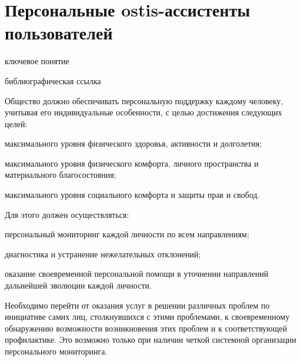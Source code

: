 \section{Персональные ostis-ассистенты пользователей}
{\label{sec_ostis_assistant}} 

\begin{SCn}

\begin{scnrelfromlist}{ключевое понятие}
\end{scnrelfromlist}

\bigskip

\begin{scnrelfromlist}{библиографическая ссылка}
\end{scnrelfromlist}

\end{SCn}

Общество должно обеспечивать персональную поддержку каждому человеку, учитывая его индивидуальные особенности, с целью достижения следующих целей:
\begin{textitemize}
    \item максимального уровня физического здоровья, активности и долголетия;
    \item максимального уровня физического комфорта, личного пространства и материального благосостояния;
    \item максимального уровня социального комфорта и защиты прав и свобод.
\end{textitemize}

Для этого должен осуществляться:
\begin{textitemize}
    \item персональный мониторинг каждой личности по всем направлениям;
    \item диагностика и устранение нежелательных отклонений;
    \item оказание своевременной персональной помощи в уточнении направлений дальнейшей эволюции каждой личности.
\end{textitemize}

Необходимо перейти от оказания услуг в решении различных проблем по инициативе самих лиц, столкнувшихся с этими проблемами, к своевременному обнаружению возможности возникновения этих проблем и к соответствующей профилактике. 
Это возможно только при наличии четкой системной организации персонального мониторинга. 

